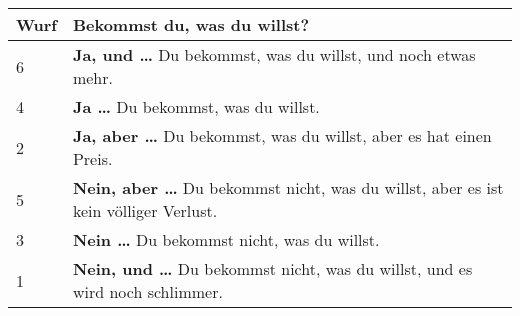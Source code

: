 \documentclass[]{article}
\begin{document}
\begin{longtable}[]{@{}ll@{}}
\toprule
\begin{minipage}[b]{0.07\columnwidth}\raggedright\strut
Wurf
\strut\end{minipage} &
\begin{minipage}[b]{0.87\columnwidth}\raggedright\strut
Bekommst du, was du willst?
\strut\end{minipage}\tabularnewline
\midrule
\endhead
\begin{minipage}[t]{0.07\columnwidth}\raggedright\strut
6
\strut\end{minipage} &
\begin{minipage}[t]{0.87\columnwidth}\raggedright\strut
\textbf{Ja, und \ldots{}} Du bekommst, was du willst, und noch etwas
mehr.
\strut\end{minipage}\tabularnewline
\begin{minipage}[t]{0.07\columnwidth}\raggedright\strut
4
\strut\end{minipage} &
\begin{minipage}[t]{0.87\columnwidth}\raggedright\strut
\textbf{Ja \ldots{}} Du bekommst, was du willst.
\strut\end{minipage}\tabularnewline
\begin{minipage}[t]{0.07\columnwidth}\raggedright\strut
2
\strut\end{minipage} &
\begin{minipage}[t]{0.87\columnwidth}\raggedright\strut
\textbf{Ja, aber \ldots{}} Du bekommst, was du willst, aber es hat einen
Preis.
\strut\end{minipage}\tabularnewline
\begin{minipage}[t]{0.07\columnwidth}\raggedright\strut
5
\strut\end{minipage} &
\begin{minipage}[t]{0.87\columnwidth}\raggedright\strut
\textbf{Nein, aber \ldots{}} Du bekommst nicht, was du willst, aber es
ist kein völliger Verlust.
\strut\end{minipage}\tabularnewline
\begin{minipage}[t]{0.07\columnwidth}\raggedright\strut
3
\strut\end{minipage} &
\begin{minipage}[t]{0.87\columnwidth}\raggedright\strut
\textbf{Nein \ldots{}} Du bekommst nicht, was du willst.
\strut\end{minipage}\tabularnewline
\begin{minipage}[t]{0.07\columnwidth}\raggedright\strut
1
\strut\end{minipage} &
\begin{minipage}[t]{0.87\columnwidth}\raggedright\strut
\textbf{Nein, und \ldots{}} Du bekommst nicht, was du willst, und es
wird noch schlimmer.
\strut\end{minipage}\tabularnewline
\bottomrule
\end{longtable}
\end{document}
